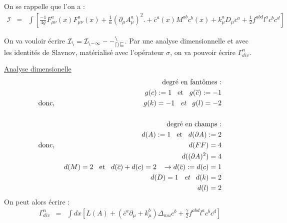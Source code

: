 \documentclass[a4paper,11pt]{article} %
\theoremstyle{plain}
\theoremstyle{definition}
\theoremstyle{remark}
\numberwithin{equation}{section}
\numberwithin{equation}{subsection}
\numberwithin{figure}{section}
\begin{document}
\noindent
On se rappelle que l'on a :
\begin{eqnarray*}
 \mathcal{I} &=&  \int \left[
\frac{-1}{4g} F^{a}_{\mu\nu}(x)F^{a}_{\mu \nu}(x) 
+ \frac{1}{\alpha}(\partial_{\mu}A_{\mu}^{a})^2 .
+ \overline{c}^{a}(x)M^{ab}c^{b}(x) 
+ k_{\mu}^{a} D_{\mu}c^{a} 
+ \frac{1}{2}f^{abd}l^ac^bc^d \right]
\end{eqnarray*} 

\noindent
On va vouloir écrire $\cal{I}_{n} = \cal{I}_{n-1} - \Gamma_{div}^{n}$. Par une analyse dimensionnelle et avec les identités de Slavnov, 
matérialisé avec l'opérateur $\sigma$, on va pouvoir écrire $\Gamma_{div}^{n}$. 

\noindent
\underline{Analyse dimensionelle}
\begin{eqnarray*}
 && \text{degré en fantômes :}\\
 && g(c) := 1 \hspace{3mm} \text{et} \hspace{3mm} g(\overline{c}):=-1 \\
 \text{donc, } && g(k) = -1 \hspace{3mm} \textit{et} \hspace{3mm} g(l)=-2\\
&& \vspace{3mm} \\
 &&\text{degré en champs :} \\
 && d(A) := 1 \hspace{3mm} \text{et} \hspace{3mm} d(\partial A):=2 \\
\text{donc, }  && d(FF)=4\\
 && d( (\partial A)^{2}) = 4\\
 && d(M) = 2  \hspace{3mm} \text{et} \hspace{3mm} d(\overline{c}) + d(c) =2 \hspace{3mm}  \rightarrow d(\overline{c}) := d(c) = 1 \\
 && d(D) =1  \hspace{3mm} \textit{et} \hspace{3mm} d(k) = 2 \\
 &&  d(l) = 2
\end{eqnarray*}
On peut alors écrire :
\begin{eqnarray*}
 \Gamma^{n}_{div} &=& \int dx \left[  L(A) +  \left(  \overline{c}^{a} \partial_{\mu}  + k_{\mu}^{b} \right) \Delta_{mu} c^{b} 
+ \frac{\gamma}{2} f^{abd} l^{a}c^{b}c^{d} \right]
\end{eqnarray*}
\end{document}
